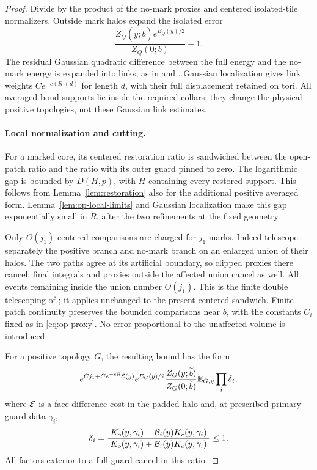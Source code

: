 \begin{proof}
Divide by the product of the no-mark proxies and centered
isolated-tile normalizers.  Outside mark halos expand the
isolated error
\[
     \frac{Z_Q(y;\widetilde b)e^{E_Q(y)/2}}{Z_Q(0;b)}-1.
\]
The residual Gaussian quadratic difference between the full
energy and the no-mark energy is expanded into links, as
in  and .  Gaussian
localization gives link weights \(Ce^{-c(R+d)}\) for length
\(d\), with their full displacement retained on tori.
All averaged-bond supports lie inside the required collars;
they change the physical positive topologies, not these
Gaussian link estimates.

\paragraph{Local normalization and cutting.}
For a marked core, its centered restoration ratio is
sandwiched between the open-patch ratio and the ratio with
its outer guard pinned to zero.  The logarithmic gap is
bounded by \(D(H,p)\), with \(H\) containing every restored
support.  This follows from Lemma~\ref{lem:restoration}
also for the additional positive averaged form.
Lemma~\ref{lem:op-local-limits} and Gaussian localization
make this gap exponentially small in \(R\), after the two
refinements at the fixed geometry.

Only \(O(j_1)\) centered comparisons are charged for
\(j_1\) marks.  Indeed telescope separately the positive
branch and no-mark branch on an enlarged union of their
halos.  The two paths agree at its artificial boundary,
so clipped proxies there cancel; final integrals and proxies
outside the affected union cancel as well.  All events
remaining inside the union number \(O(j_1)\).  This is the
finite double telescoping of ;
it applies unchanged to the present centered sandwich.
Finite-patch continuity preserves the bounded comparisons
near \(b\), with the constants \(C_i\) fixed as in
\eqref{eq:op-proxy}.  No error proportional to the
unaffected volume is introduced.

For a positive topology \(G\), the resulting bound has
the form
\begin{equation}\label{eq:op-pattern-before-cut}
 e^{Cj_1+Ce^{-cR}{\cal E}(y)}
 e^{E_G(y)/2}\frac{Z_G(y;\widetilde b)}{Z_G(0;\widetilde b)}
                  \mathbb E_{G,y}\prod_i\delta_i,
\end{equation}
where \({\cal E}\) is a face-difference cost in the padded
halo and, at prescribed primary guard data \(\gamma_i\),
\[
 \delta_i=
 \frac{|K_o(y,\gamma_i)-{\cal B}_i(y)K_c(y,\gamma_i)|}
      {K_o(y,\gamma_i)+{\cal B}_i(y)K_c(y,\gamma_i)}
                         \leq1.
\]
All factors exterior to a full guard cancel in this ratio.


\end{proof}
